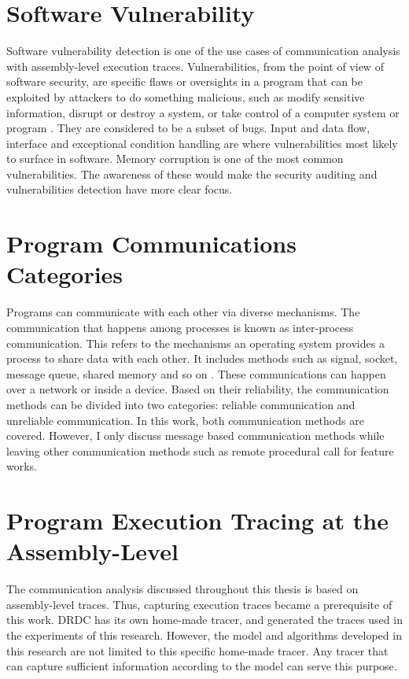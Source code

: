 \documentclass[12pt,oneside]{book}
\begin{document}
\section{Software Vulnerability}
Software vulnerability detection is one of the use cases of communication analysis with assembly-level execution traces. Vulnerabilities, from the point of view of software security, are specific flaws or oversights in a program that can be exploited by attackers to do something malicious, such as modify sensitive information, disrupt or destroy a system, or take control of a computer system or program \cite{dowd_art_2006}. They are considered to be a subset of bugs. Input and data flow, interface and exceptional condition handling are where vulnerabilities most likely to surface in software. Memory corruption is one of the most common vulnerabilities. The awareness of these would make the security auditing and vulnerabilities detection have more clear focus. 

\section{Program Communications Categories}
Programs can communicate with each other via diverse mechanisms. The communication that happens among processes is known as inter-process communication. This refers to the mechanisms an operating system provides a process to share data with each other. It includes methods such as signal, socket, message queue, shared memory and so on \cite{garrido2000inter}. These communications can happen over a network or inside a device. Based on their reliability, the communication methods can be divided into two categories: reliable communication and unreliable communication. In this work, both communication methods are covered. However, I only discuss message based communication methods while leaving other communication methods such as remote procedural call for feature works.

\section{Program Execution Tracing at the Assembly-Level}
The communication analysis discussed throughout this thesis is based on assembly-level traces. Thus, capturing execution traces became a prerequisite of this work. DRDC has its own home-made tracer, and generated the traces used in the experiments of this research. However, the model and algorithms developed in this research are not limited to this specific home-made tracer. Any tracer that can capture sufficient information according to the model can serve this purpose.
\end{document}
